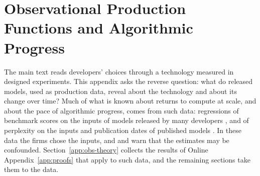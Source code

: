 
\section{Observational Production Functions and Algorithmic Progress}\label{app:obs}

The main text reads developers' choices through a technology measured in designed experiments. This appendix asks the
reverse question: what do released models, used as production data, reveal about the technology and about its change
over time? Much of what is known about returns to compute at scale, and about the pace of algorithmic progress, comes
from such data: regressions of benchmark scores on the inputs of models released by many developers
\citep{ruan2024observational,maiapolo2024sloth,owen2024predictable,mertens2026secret}, and of perplexity on the inputs
and publication dates of published models \citep{ho2024algorithmic}. In these data the firms chose the inputs, and
\citet{whitfill2025note} and \citet{konig2026validity} warn that the estimates may be confounded.
Section~\ref{app:obs-theory} collects the results of Online Appendix~\ref{app:proofs} that apply to such data, and the
remaining sections take them to the data.

